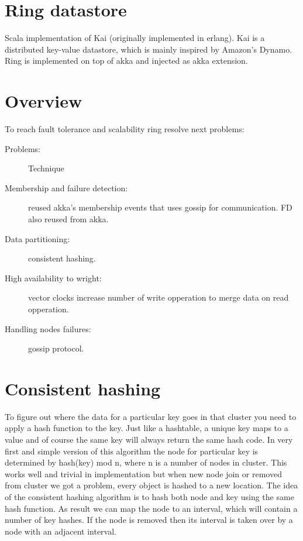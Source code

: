 \section{Ring datastore}

Scala implementation of Kai (originally implemented in erlang).
Kai is a distributed key-value datastore, which is mainly inspired
by Amazon's Dynamo. Ring is implemented on top of akka and injected as akka extension.

\section*{Overview}

To reach fault tolerance and scalability ring resolve next problems:

\begin{description}

\item[Problems:] Technique
\item[Membership and failure detection: ] reused akka's membership events that uses gossip for communication. FD also reused from akka.
\item[Data partitioning:] consistent hashing.
\item[High availability to wright:] vector clocks increase number of write opperation to merge data on read opperation.
\item[Handling nodes failures:] gossip protocol.

\end{description}

\section*{Consistent hashing}

To figure out where the data for a particular key goes in that cluster you need to apply a hash function to the key.
Just like a hashtable, a unique key maps to a value and of course the same key will always return the same hash code.
In very first and simple version of this algorithm the node for particular key is determined by hash(key) mod n, where n is a number of
nodes in cluster. This works well and trivial in implementation but when new node join or removed from cluster we got a problem, every object is hashed to a new location.
The idea of the consistent hashing algorithm is to hash both node and key using the same hash function.
As result we can map the node to an interval, which will contain a number of key hashes. If the node is removed
then its interval is taken over by a node with an adjacent interval.

